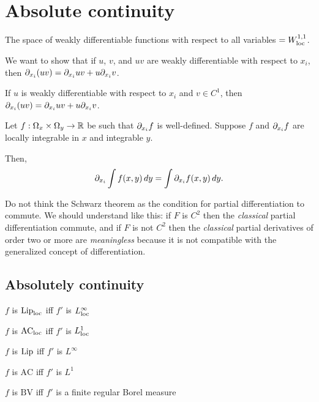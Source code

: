 \documentclass{../../large}
\begin{document}
\chapter{Absolute continuity}

The space of weakly differentiable functions with respect to all variables $=W_{\mathrm{loc}}^{1,1}$.

\begin{prb}
We want to show that if $u$, $v$, and $uv$ are weakly differentiable with respect to $x_i$, then $\pd_{x_i}(uv)=\pd_{x_i}uv+u\pd_{x_i}v$.
\begin{parts}
\item If $u$ is weakly differentiable with respect to $x_i$ and $v\in C^1$, then $\pd_{x_i}(uv)=\pd_{x_i}uv+u\pd_{x_i}v$.
\end{parts}
\end{prb}


\begin{prb}
Let $f:\Omega_x\times\Omega_y\to\mathbb{R}$ be such that $\pd_{x_i}f$ is well-defined. Suppose $f$ and $\pd_{x_i}f$ are locally integrable in $x$ and integrable $y$.

Then,
\[\pd_{x_i}\int f(x,y)\,dy=\int\pd_{x_i}f(x,y)\,dy.\]
\end{prb}


Do not think the Schwarz theorem as the condition for partial differentiation to commute.
We should understand like this: if $F$ is $C^2$ then the \emph{classical} partial differentiation commute, and if $F$ is not $C^2$ then the \emph{classical} partial derivatives of order two or more are \emph{meaningless} because it is not compatible with the generalized concept of differentiation.



\section{Absolutely continuity}

\begin{parts}
\item $f$ is $\operatorname{Lip}_{\mathrm{loc}}$ iff $f'$ is $L_{\mathrm{loc}}^\infty$
\item $f$ is $\textrm{AC}_{\mathrm{loc}}$ iff $f'$ is $L_{\mathrm{loc}}^1$
\end{parts}
\begin{parts}
\item $f$ is $\operatorname{Lip}$ iff $f'$ is $L^\infty$
\item $f$ is $\textrm{AC}$ iff $f'$ is $L^1$
\item $f$ is $\textrm{BV}$ iff $f'$ is a finite regular Borel measure
\end{parts}
\end{document}
